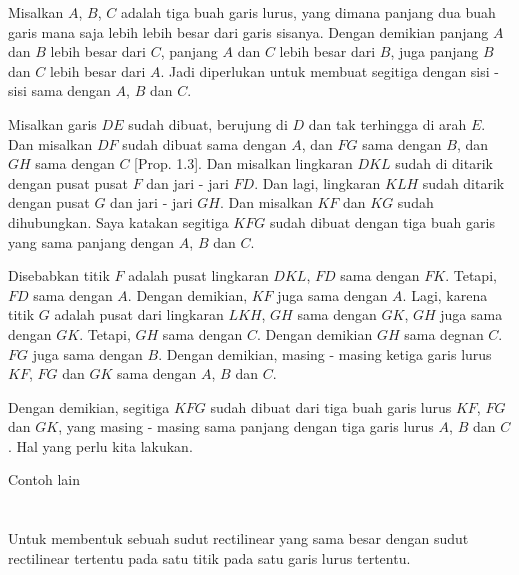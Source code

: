 \documentclass[a4paper]{book}
\begin{document}
Misalkan $A$, $B$, $C$ adalah tiga buah garis lurus, yang dimana panjang
dua buah garis mana saja lebih lebih besar dari garis sisanya. Dengan demikian
panjang $A$ dan $B$ lebih besar dari $C$, panjang $A$ dan $C$ lebih besar dari
$B$, juga panjang $B$ dan $C$ lebih besar dari $A$. Jadi diperlukan untuk
membuat segitiga dengan sisi - sisi sama dengan $A$, $B$ dan $C$.

Misalkan garis $DE$ sudah dibuat, berujung di $D$ dan tak terhingga di arah $E$.
Dan misalkan $DF$ sudah dibuat sama dengan $A$, dan $FG$ sama dengan $B$, dan 
$GH$ sama dengan $C$ [Prop. 1.3]. Dan misalkan lingkaran $DKL$ sudah di ditarik
dengan pusat pusat $F$ dan jari - jari $FD$. Dan lagi, lingkaran $KLH$ sudah
ditarik dengan pusat $G$ dan jari - jari $GH$. Dan misalkan $KF$ dan $KG$ sudah
dihubungkan. Saya katakan segitiga $KFG$ sudah dibuat dengan tiga buah
garis yang sama panjang dengan $A$, $B$ dan $C$.

Disebabkan titik $F$ adalah pusat lingkaran $DKL$, $FD$ sama dengan $FK$. 
Tetapi, $FD$ sama dengan $A$. Dengan demikian, $KF$ juga sama dengan $A$. Lagi, 
karena titik $G$ adalah pusat dari lingkaran $LKH$, $GH$ sama dengan $GK$, $GH$
juga sama dengan $GK$. Tetapi, $GH$ sama dengan $C$. Dengan demikian $GH$ sama
degnan $C$. $FG$ juga sama dengan $B$. Dengan demikian, masing - masing 
ketiga garis lurus $KF$, $FG$ dan $GK$ sama dengan  $A$, $B$ dan $C$.

Dengan demikian, segitiga $KFG$ sudah dibuat dari tiga buah garis lurus $KF$, 
$FG$ dan $GK$, yang masing - masing sama panjang dengan tiga garis lurus 
$A$, $B$ dan $C$. Hal yang perlu kita lakukan.


Contoh lain

\begin{center}
\end{center}


\section*{\centering \thesection}
Untuk membentuk sebuah sudut rectilinear yang sama besar dengan sudut 
rectilinear tertentu pada satu titik pada satu garis lurus tertentu.
\end{document}
